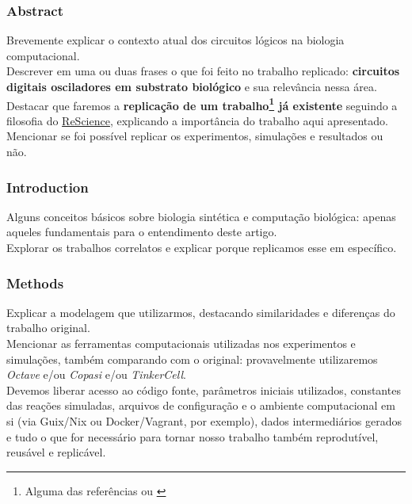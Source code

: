 
\subsubsection{Abstract}

Brevemente explicar o contexto atual dos circuitos lógicos na biologia computacional.\\
Descrever em uma ou duas frases o que foi feito no trabalho replicado: \textbf{circuitos digitais osciladores em substrato biológico} e sua relevância nessa área.\\
Destacar que faremos a \textbf{replicação de um trabalho\footnote{Alguma das referências \cite{oscillator} ou \cite{clock}} já existente} seguindo a filosofia do \href{http://rescience.github.io/}{ReScience}, explicando a importância do trabalho aqui apresentado.\\
Mencionar se foi possível replicar os experimentos, simulações e resultados ou não.\\


\subsubsection{Introduction}

Alguns conceitos básicos sobre biologia sintética e computação biológica: apenas aqueles fundamentais para o entendimento deste artigo.\\
Explorar os trabalhos correlatos e explicar porque replicamos esse em específico.\\


\subsubsection{Methods}

Explicar a modelagem que utilizarmos, destacando similaridades e diferenças do trabalho original.\\
Mencionar as ferramentas computacionais utilizadas nos experimentos e simulações, também comparando com o original: provavelmente utilizaremos \textit{Octave} e/ou \textit{Copasi} e/ou \textit{TinkerCell}.\\
Devemos liberar acesso ao código fonte, parâmetros iniciais utilizados, constantes das reações simuladas, arquivos de configuração e o ambiente computacional em si (via Guix/Nix ou Docker/Vagrant, por exemplo), dados intermediários gerados e tudo o que for necessário para tornar nosso trabalho também reprodutível, reusável e replicável.\\

